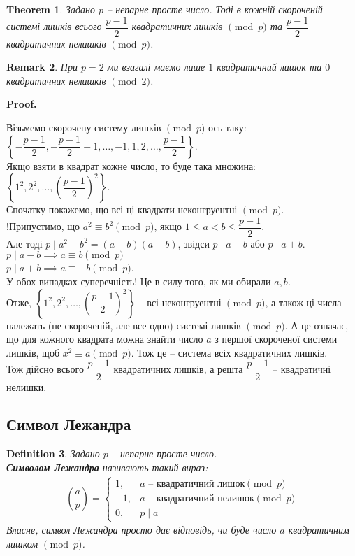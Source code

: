 \documentclass[a4paper, 14pt]{extarticle}
\makeatletter
\theoremstyle{theoremdd}
\newtheorem{theorem}{Theorem}[subsection]
\theoremstyle{theoremdd}
\newtheorem{definition}[theorem]{Definition}
\theoremstyle{theoremdd}
\theoremstyle{theoremdd}
\theoremstyle{theoremdd}
\theoremstyle{theoremdd}
\newtheorem{remark}[theorem]{Remark}
\theoremstyle{theoremdd}
\theoremstyle{theoremdd}
\def\qed{$\blacksquare$}
\renewenvironment{proof}[1][Proof.\\]{\par
\pushQED{\hfill \qed}%
\normalfont \topsep6\p@\@plus6\p@\relax
\trivlist
\item\relax
{\bfseries
#1\@addpunct{.}}\hspace\labelsep\ignorespaces
}{%
\popQED\endtrivlist\@endpefalse
}
\makeatother
\begin{document}
\begin{theorem}
Задано $p$ -- непарне просте число. Тоді в кожній скороченій системі лишків всього $\dfrac{p-1}{2}$ квадратичних лишків $\pmod p$ та $\dfrac{p-1}{2}$ квадратичних нелишків $\pmod p$.
\end{theorem}

\begin{remark}
При $p =2$ ми взагалі маємо лише $1$ квадратичний лишок та $0$ квадратичних нелишків $\pmod 2$.
\end{remark}

\begin{proof}
Візьмемо скорочену систему лишків $\pmod p$ ось таку: \\ $\left\{ -\dfrac{p-1}{2}, -\dfrac{p-1}{2}+1,\dots, -1,1,2,\dots,\dfrac{p-1}{2} \right\}$.\\
Якщо взяти в квадрат кожне число, то буде така множина:\\
$\left\{1^2,2^2,\dots, \left( \dfrac{p-1}{2} \right)^2 \right\}$.\\
Спочатку покажемо, що всі ці квадрати неконгруентні $\pmod p$.\\
!Припустимо, що $a^2 \equiv b^2 \pmod p$, якщо $1 \leq a < b \leq \dfrac{p-1}{2}$.\\
Але тоді $p \mid a^2-b^2 = (a-b)(a+b)$, звідси $p \mid a-b$ або $p \mid a+b$.\\
$p \mid a-b \implies a \equiv b \pmod p$\\
$p \mid a+b \implies a \equiv -b \pmod p$.\\
У обох випадках суперечність! Це в силу того, як ми обирали $a,b$.\\
Отже, $\left\{1^2,2^2,\dots, \left( \dfrac{p-1}{2} \right)^2 \right\}$ -- всі неконгруентні $\pmod p$, а також ці числа належать (не скороченій, але все одно) системі лишків $\pmod p$. А це означає, що для кожного квадрата можна знайти число $a$ з першої скороченої системи лишків, щоб $x^2 \equiv a \pmod p$. Тож це -- система всіх квадратичних лишків.\\
Тож дійсно всього $\dfrac{p-1}{2}$ квадратичних лишків, а решта $\dfrac{p-1}{2}$ -- квадратичні нелишки.
\end{proof}

\subsection{Символ Лежандра}
\begin{definition}
Задано $p$ -- непарне просте число.\\
\textbf{Символом Лежандра} називають такий вираз:
\begin{align*}
\left( \dfrac{a}{p} \right) = \begin{cases} 1, & a \text{ -- квадратичний лишок} \pmod p \\ -1 , & a \text{ -- квадратичний нелишок} \pmod p \\ 0, & p \mid a \end{cases}
\end{align*}
Власне, символ Лежандра просто дає відповідь, чи буде число $a$ квадратичним лишком $\pmod p$.
\end{definition}
\end{document}
